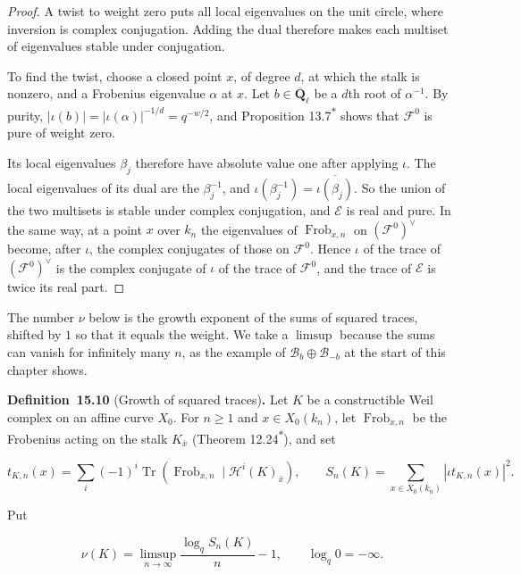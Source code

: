 \documentclass[11pt]{article}
\newenvironment{bpstatement}[2]{\par\addvspace{0.6\baselineskip}\noindent\textbf{#1}#2\textbf{.}\enspace\ignorespaces}
  {\par\addvspace{0.4\baselineskip}}
\newcommand{\bpout}[1]{#1\textsuperscript{\hyperlink{bp-outside}{\ensuremath{\ast}}}}
\begin{document}
\begin{proof}[{Proof}]\label{bp28}%
A twist to weight zero puts all local eigenvalues on the unit circle, where inversion is complex conjugation. Adding the dual therefore makes each multiset of eigenvalues stable under conjugation.

To find the twist, choose a closed point \(x\), of degree \(d\), at which the stalk is nonzero, and a Frobenius eigenvalue \(\alpha\) at \(x\).  Let \(b\in\overline{\mathbf Q}_\ell\) be a \(d\)th root of \(\alpha^{-1}\).  By purity, \(|\iota(b)|=|\iota(\alpha)|^{-1/d}=q^{-w/2}\), and Proposition \bpout{13.7} shows that \(\mathcal F^0\) is pure of weight zero.

Its local eigenvalues \(\beta_j\) therefore have absolute value one after applying \(\iota\). The local eigenvalues of its dual are the \(\beta_j^{-1}\), and \(\iota(\beta_j^{-1})=\overline{\iota(\beta_j)}\). So the union of the two multisets is stable under complex conjugation, and \(\mathcal E\) is real and pure. In the same way, at a point \(x\) over \(k_n\) the eigenvalues of \(\operatorname{Frob}_{x,n}\) on \((\mathcal F^0)^\vee\) become, after \(\iota\), the complex conjugates of those on \(\mathcal F^0\). Hence \(\iota\) of the trace of \((\mathcal F^0)^\vee\) is the complex conjugate of \(\iota\) of the trace of \(\mathcal F^0\), and the trace of \(\mathcal E\) is twice its real part.
\end{proof}

\label{bp29}%
The number \(\nu\) below is the growth exponent of the sums of squared traces, shifted by \(1\) so that it equals the weight. We take a \(\limsup\) because the sums can vanish for infinitely many \(n\), as the example of \(\mathcal B_b\oplus\mathcal B_{-b}\) at the start of this chapter shows.

\label{bp30}%
\begin{bpstatement}{Definition~15.10}{ (Growth of squared traces)}
Let \(K\) be a constructible Weil complex on an affine curve \(X_0\). For \(n\ge1\) and \(x\in X_0(k_n)\), let \(\operatorname{Frob}_{x,n}\) be the Frobenius acting on the stalk \(K_{\bar x}\) (Theorem \bpout{12.24}), and set

\[
t_{K,n}(x)=\sum_i(-1)^i\operatorname{Tr}
(\operatorname{Frob}_{x,n}\mid\mathcal H^i(K)_{\bar x}),\qquad
S_n(K)=\sum_{x\in X_0(k_n)}|\iota t_{K,n}(x)|^2.
\]

Put

\[
\nu(K)=\limsup_{n\to\infty}\frac{\log_q S_n(K)}n-1,
\qquad \log_q0=-\infty.
\]
\end{bpstatement}
\end{document}
